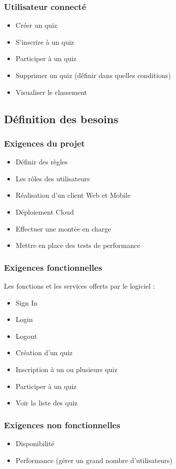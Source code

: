 \documentclass[a4paper, 12pt]{article}
\begin{document}
\subsubsection{Utilisateur connecté}
\begin{itemize}
    \item Créer un quiz
    \item S'inscrire à un quiz
    \item Participer à un quiz
    \item Supprimer un quiz (définir dans quelles conditions)
    \item Visualiser le classement
\end{itemize}
\subsection{Définition des besoins}
\subsubsection{Exigences du projet}
\begin{itemize}
    \item Définir des règles
    \item Les rôles des utilisateurs
    \item Réalisation d'un client Web et Mobile
    \item Déploiement Cloud
    \item Effectuer une montée en charge
    \item Mettre en place des tests de performance
\end{itemize}
\subsubsection{Exigences fonctionnelles}
Les fonctions et les services offerts par le logiciel :
\begin{itemize}
    \item Sign In
    \item Login
    \item Logout
    \item Création d'un quiz
    \item Inscription à un ou plusieurs quiz
    \item Participer à un quiz
    \item Voir la liste des quiz
\end{itemize}
\subsubsection{Exigences non fonctionnelles}
\begin{itemize}
    \item Disponibilité
    \item Performance (gérer un grand nombre d'utilisateurs)
\end{itemize}
\end{document}
